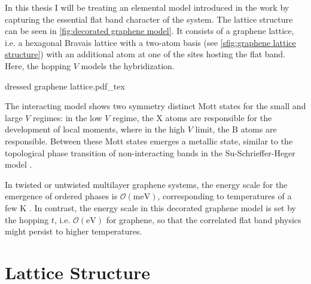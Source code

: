 \documentclass[../main.tex]{subfiles}
\begin{document}
In this thesis I will be treating an elemental model introduced in the work by \citeauthor{wittQuantumGeometryLocal2025} capturing the essential flat band character of the system.
The lattice structure can be seen in \cref{fig:decorated graphene model}.
It consists of a graphene lattice, i.e. a hexagonal Bravais lattice with a two-atom basis \cite{yangStructureGrapheneIts2018} (see \cref{sfig:graphene lattice structure}) with an additional atom at one of the sites hosting the flat band.
Here, the hopping \(V\) models the hybridization.
\begin{SCfigure}[50][t]
	\centering
	{dressed graphene lattice.pdf_tex}
	\caption[Lattice structure of the decorated graphene honeycomb lattice.]{\textbf{Lattice structure of the decorated graphene honeycomb lattice.} It has the Graphene hopping \(t\) between sublattices \(\mathrm{A}\) and \(\mathrm{B}\) as well as the hybridization \(V\) between \(\mathrm{X}\) and \(\mathrm{A}\) atoms. Created using VESTA \cite{mommaVESTA3Threedimensional2011}.}
	\label{fig:decorated graphene model}
\end{SCfigure}

The interacting model shows two symmetry distinct Mott states for the small and large \(V\) regimes: in the low \(V\) regime, the \(\mathrm{X}\) atoms are responsible for the development of local moments, where in the high \(V\) limit, the \(\mathrm{B}\) atoms are responsible.
Between these Mott states emerges a metallic state, similar to the topological phase transition of non-interacting bands in the Su-Schrieffer-Heger model \cite{suSolitonExcitationsPolyacetylene1980}.

In twisted or untwisted multilayer graphene systems, the energy scale for the emergence of ordered phases is \(\mathcal{O} (\unit{\milli\electronvolt})\), corresponding to temperatures of a few \unit{\kelvin} \cite{nuckollsMicroscopicPerspectiveMoire2024, pantaleonSuperconductivityCorrelatedPhases2023a}.
In contrast, the energy scale in this decorated graphene model is set by the hopping \(t\), i.e. \(\mathcal{O} (\unit{\electronvolt})\) for graphene, so that the correlated flat band physics might persist to higher temperatures.

\section{Lattice Structure}\label{sec:lattice and band structure}
\end{document}
